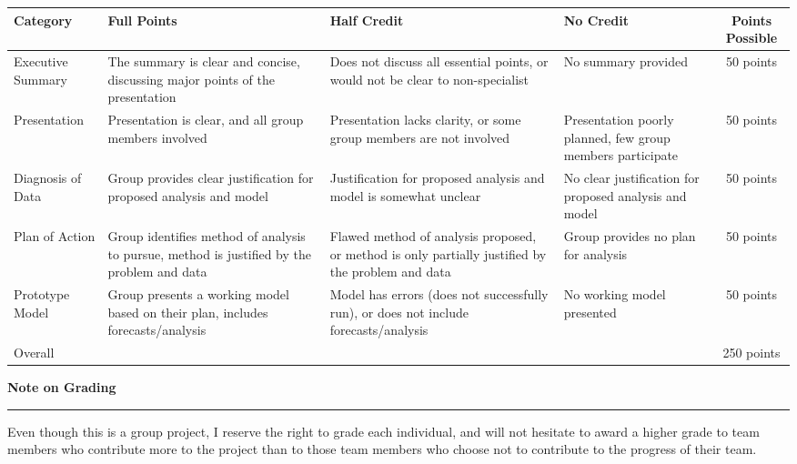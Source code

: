 \documentclass{article}
\begin{document}
\renewcommand{\arraystretch}{2}%
\begin{table}[htp]
\begin{tabularx}{\linewidth}{l|XXX|c}
Category & Full Points & Half Credit & No Credit & Points Possible \\[.2em]
\hline
Executive Summary & The summary is clear and concise, discussing major points of the presentation & Does not discuss all essential points, or would not be clear to non-specialist & No summary provided & 50 points\\
Presentation & Presentation is clear, and all group members involved & Presentation lacks clarity, or some group members are not involved & Presentation poorly planned, few group members participate & 50 points\\
Diagnosis of Data & Group provides clear justification for proposed analysis and model & Justification for proposed analysis and model is somewhat unclear & No clear justification for proposed analysis and model & 50 points\\
Plan of Action & Group identifies method of analysis to pursue, method is justified by the problem and data & Flawed method of analysis proposed, or method is only partially justified by the problem and data & Group provides no plan for analysis & 50 points\\
Prototype Model & Group presents a working model based on their plan, includes forecasts/analysis & Model has errors (does not successfully run), or does not include forecasts/analysis & No working model presented & 50 points\\
\hline
Overall & & & & 250 points
\end{tabularx}
\end{table}


\vspace*{2em}
\noindent \Large \textbf{Note on Grading}\\[-.8em]\hrule \vspace*{.5em}
\large \noindent Even though this is a group project, I reserve the right to grade each individual, and will not hesitate to award a higher grade to team members who contribute more to the project than to those team members who choose not to contribute to the progress of their team.\vspace*{.5em}
\end{document}
